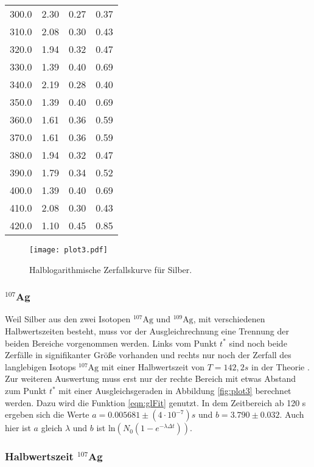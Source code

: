 \begin{table}
\begin{tabular}{c c c c}
  300.0 & 2.30 & 0.27 & 0.37 \\
  310.0 & 2.08 & 0.30 & 0.43 \\
  320.0 & 1.94 & 0.32 & 0.47 \\
  330.0 & 1.39 & 0.40 & 0.69 \\
  340.0 & 2.19 & 0.28 & 0.40 \\
  350.0 & 1.39 & 0.40 & 0.69 \\
  360.0 & 1.61 & 0.36 & 0.59 \\
  370.0 & 1.61 & 0.36 & 0.59 \\
  380.0 & 1.94 & 0.32 & 0.47 \\
  390.0 & 1.79 & 0.34 & 0.52 \\
  400.0 & 1.39 & 0.40 & 0.69 \\
  410.0 & 2.08 & 0.30 & 0.43 \\
  420.0 & 1.10 & 0.45 & 0.85 \\
  \bottomrule
\end{tabular}
\end{table}
\FloatBarrier

\begin{figure}
  \centering
  \texttt{[image: plot3.pdf]}
  \caption{Halblogarithmische Zerfallskurve für Silber.}
  \label{fig:plot2}
\end{figure}
\FloatBarrier

\subsubsection{$^{107}$Ag}

Weil Silber aus den zwei Isotopen $^{107}\text{Ag}$ und $^{109}\text{Ag}$, mit verschiedenen Halbwertszeiten besteht, muss vor der Ausgleichrechnung eine Trennung der beiden Bereiche vorgenommen werden.
Links vom Punkt $t^*$ sind noch beide Zerfälle in signifikanter Größe vorhanden und rechts nur noch der Zerfall des langlebigen Isotops $^{107}\text{Ag}$ mit einer Halbwertszeit von $T = 142,2 s$ in der Theorie \cite{Periode}.
Zur weiteren Auswertung muss erst nur der rechte Bereich mit etwas Abstand zum Punkt $t^*$ mit einer Ausgleichsgeraden in Abbildung \ref{fig:plot3} berechnet werden.
Dazu wird die Funktion \ref{eqn:glFit} genutzt.
In dem Zeitbereich ab 120 s ergeben sich die Werte $a =  0.005681 \pm (4 \cdot 10^{-7}) s$ und $b = 3.790 \pm 0.032$.
Auch hier ist $a$ gleich $\lambda$ und $b$ ist $\text{ln}(N_0(1-e^{-\lambda \Delta t}))$.

\subsubsection{Halbwertszeit $^{107}$Ag}

